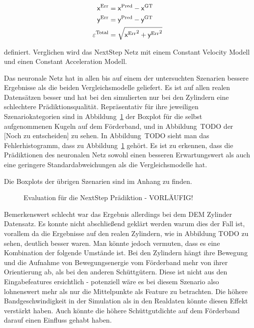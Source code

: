 \begin{align*}
    \mathsf{x}{^{\text{Err}}} &=  \mathsf{x}{^{\text{Pred}}} -  \mathsf{x}{^{\text{GT}}} \\
    \mathsf{y}{^{\text{Err}}} &=  \mathsf{y}{^{\text{Pred}}} -  \mathsf{y}{^{\text{GT}}} \\
    \varepsilon{^{\text{Total}}} &= \sqrt{ \mathsf{x}{^{\text{Err}}}^2 +  \mathsf{y}{^{\text{Err}}}^2}
\end{align*}

definiert. Verglichen wird das NextStep Netz mit einem Constant Velocity Modell und einen Constant Acceleration Modell.

Das neuronale Netz hat in allen bis auf einem der untersuchten Szenarien bessere Ergebnisse als die beiden Vergleichsmodelle geliefert.
Es ist auf allen realen Datensätzen besser und hat bei den simulierten nur bei den Zylindern eine schlechtere Prädiktionsqualität.
Repräsentativ für ihre jeweiligen Szenariokategorien sind in Abbildung~\ref{fig:boxplotErrorNNnextStep} der Boxplot für die selbst aufgenommenen Kugeln auf dem Förderband,
und in Abbildung~TODO der [Noch zu entscheiden] zu sehen.
In Abbildung~TODO sieht man das Fehlerhistogramm, dass zu Abbildung~\ref{fig:boxplotErrorNNnextStep} gehört.
Es ist zu erkennen, dass die Prädiktionen des neuronalen Netz sowohl einen besseren Erwartungswert als auch eine geringere Standardabweichungen als die Vergleichsmodelle hat.


Die Boxplots der übrigen Szenarien sind im Anhang zu finden.



\begin{figure}[h]
    \centering
	\caption{Evaluation für die NextStep Prädiktion - VORLÄUFIG!}
	\label{fig:boxplotErrorNNnextStep}
\end{figure}



Bemerkenswert schlecht war das Ergebnis allerdings bei dem DEM Zylinder Datensatz.
Es konnte nicht abschließend geklärt werden warum dies der Fall ist, vorallem da die Ergebnisse auf den realen Zylindern, wie in Abbildung TODO zu sehen, deutlich besser waren. 
Man könnte jedoch vermuten, dass es eine Kombination der folgende Umstände ist.
Bei den Zylindern hängt ihre Bewegung und die Aufnahme von Bewegungsenergie vom Förderband mehr von ihrer Orientierung ab, als bei den anderen Schüttgütern.
Diese ist nicht aus den Eingabefeatures ersichtlich - potenziell wäre es bei diesem Szenario also lohnenswert mehr als nur die Mittelpunkte als Feature zu betrachten.
Die höhere Bandgeschwindigkeit in der Simulation als in den Realdaten könnte diesen Effekt verstärkt haben.
Auch könnte die höhere Schüttgutdichte auf dem Förderband darauf einen Einfluss gehabt haben.



